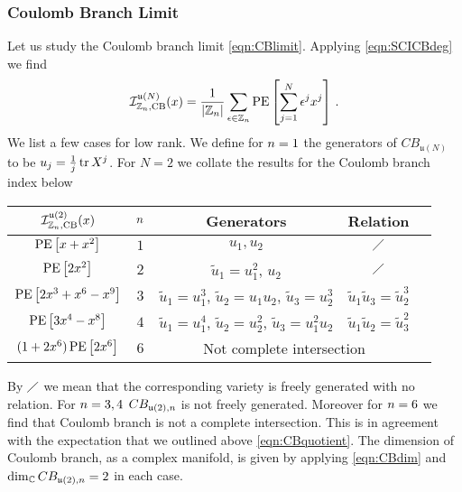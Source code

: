 \documentclass[main.tex]{subfiles}
\begin{document}
\subsubsection*{Coulomb Branch Limit}
Let us study the Coulomb branch limit \eqref{eqn:CBlimit}. Applying \eqref{eqn:SCICBdeg} we find
\begin{equation}\label{eqn:uNCBIndex}
\mathcal{I}_{\mathbb{Z}_{n},\text{CB}}^{\mathfrak{u}(N)}(x)=\frac{1}{|\mathbb{Z}_{n}|}\sum_{\epsilon\in\mathbb{Z}_{n}}\operatorname{\mathrm{PE}}\left[\sum_{j=1}^N\epsilon^jx^j\right]\,.
\end{equation}
We list a few cases for low rank. We define for ${n}=1$ the generators of $CB_{\mathfrak{u}(N)}$ to be $u_j=\frac{1}{j}\operatorname{tr} X^j$. For $N=2$ we collate the results for the Coulomb branch index below 
\begin{center}
\begin{tabular}{|c|c|c|c|c|}
\hline
$\mathcal{I}_{\mathbb{Z}_{n},\text{CB}}^{\mathfrak{u}(2)}(x)$&${n}$&Generators&Relation\\[2pt] \hline
$\operatorname{\mathrm{PE}}\left[x+x^2\right]$ & $1$ &$u_1,u_2$& $\diagup$ \\[2pt] \hline
$\operatorname{\mathrm{PE}}\left[2x^2\right]$ & $2$ &$\widetilde{u}_1=u_1^2$, $u_2$& $\diagup$\\\hline
$\operatorname{\mathrm{PE}}\left[2x^3+x^6-x^9\right]$&$3$&$\widetilde{u}_1=u_1^3$, $\widetilde{u}_2=u_1u_2$, $\widetilde{u}_3=u_2^3$&$\widetilde{u}_1\widetilde{u}_3=\widetilde{u}_2^3$\\\hline
$\operatorname{\mathrm{PE}}\left[3x^4-x^8\right]$&$4$&$\widetilde{u}_1=u_1^4$, $\widetilde{u}_2=u_2^2$, $\widetilde{u}_3=u_1^2u_2$&$\widetilde{u}_1\widetilde{u}_2=\widetilde{u}_3^2$\\\hline
$(1+2x^6)\operatorname{\mathrm{PE}}\left[2x^6\right]$&$6$&\multicolumn{2}{c|}{Not complete intersection}\\\hline
\end{tabular}
\end{center}
By $\diagup$ we mean that the corresponding variety is freely generated with no relation. For ${n}=3,4$ $CB_{\mathfrak{u}(2),n}$ is not freely generated. Moreover for ${n}=6$ we find that Coulomb branch is not a complete intersection. This is in agreement with the expectation that we outlined above \eqref{eqn:CBquotient}. The dimension of Coulomb branch, as a complex manifold, is given by applying \eqref{eqn:CBdim} and $\dim_{\mathbb{C}} CB_{\mathfrak{u}(2),n}=2$ in each case.
\begin{comment}
Since we expect that the Plethystic logarithm of the Coulomb branch index is counting the number of generators of the Coulomb branch chiral ring, i.e. the number of independent $\mathcal{E}_{r,(0,0)}$ multiplets, minus relations. Let us examine this case in a bit more detail. 
\end{comment} 
\end{document}
